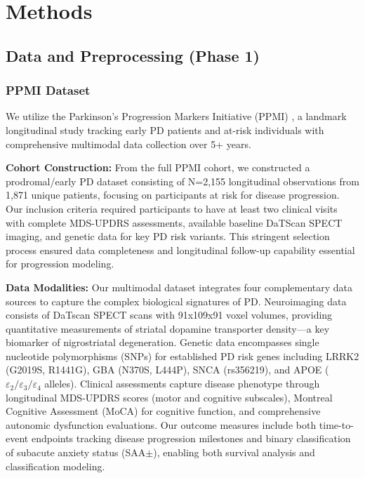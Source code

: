 \documentclass[journal,twoside,web]{ieeecolor}
\begin{document}
\section{Methods}
\label{sec:methods}

\subsection{Data and Preprocessing (Phase 1)}

\subsubsection{PPMI Dataset}
We utilize the Parkinson's Progression Markers Initiative (PPMI) \cite{marek2011ppmi}, a landmark longitudinal study tracking early PD patients and at-risk individuals with comprehensive multimodal data collection over 5+ years.

\textbf{Cohort Construction:} From the full PPMI cohort, we constructed a prodromal/early PD dataset consisting of N=2,155 longitudinal observations from 1,871 unique patients, focusing on participants at risk for disease progression. Our inclusion criteria required participants to have at least two clinical visits with complete MDS-UPDRS assessments, available baseline DaTScan SPECT imaging, and genetic data for key PD risk variants. This stringent selection process ensured data completeness and longitudinal follow-up capability essential for progression modeling.

\textbf{Data Modalities:} Our multimodal dataset integrates four complementary data sources to capture the complex biological signatures of PD. Neuroimaging data consists of DaTscan SPECT scans with 91x109x91 voxel volumes, providing quantitative measurements of striatal dopamine transporter density---a key biomarker of nigrostriatal degeneration. Genetic data encompasses single nucleotide polymorphisms (SNPs) for established PD risk genes including LRRK2 (G2019S, R1441G), GBA (N370S, L444P), SNCA (rs356219), and APOE ($\varepsilon_2 / \varepsilon_3 / \varepsilon_4$ alleles). Clinical assessments capture disease phenotype through longitudinal MDS-UPDRS scores (motor and cognitive subscales), Montreal Cognitive Assessment (MoCA) for cognitive function, and comprehensive autonomic dysfunction evaluations. Our outcome measures include both time-to-event endpoints tracking disease progression milestones and binary classification of subacute anxiety status (SAA$\pm$), enabling both survival analysis and classification modeling.
\end{document}
